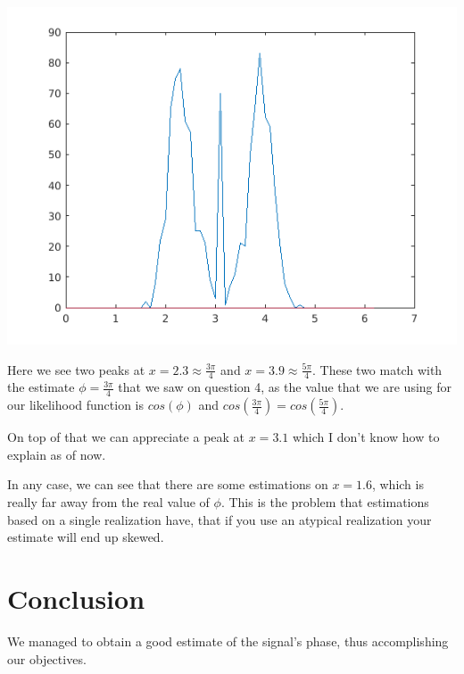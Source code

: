 \documentclass[conference,9pt]{IEEEtran}
\begin{document}
\includegraphics[scale=0.6]{all}

Here we see two peaks at $x=2.3\approx \frac{3\pi}{4}$ and $x=3.9 \approx \frac{5\pi}{4}$. These two match with the estimate $\phi=\frac{3\pi}{4}$ that we saw on question 4, as the value that we are using for our likelihood function is $cos(\phi)$ and $cos(\frac{3\pi}{4})=cos(\frac{5\pi}{4})$.

On top of that we can appreciate a peak at $x=3.1$ which I don't know how to explain as of now.

In any case, we can see that there are some estimations on $x=1.6$, which is really far away from the real value of $\phi$. This is the problem that estimations based on a single realization have, that if you use an atypical realization your estimate will end up skewed.

\section{Conclusion}
We managed to obtain a good estimate of the signal's phase, thus accomplishing our objectives.
\end{document}
